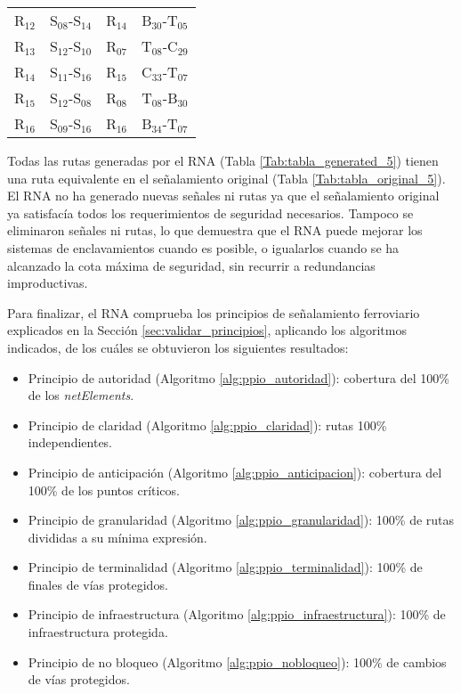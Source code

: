 \begin{table}[H]
{\begin{center}
{\begin{tabular}{ c c c c }
                    R$_{12}$ & S$_{08}$-S$_{14}$ & R$_{14}$ & B$_{30}$-T$_{05}$ \\
                    R$_{13}$ & S$_{12}$-S$_{10}$ & R$_{07}$ & T$_{08}$-C$_{29}$ \\
                    R$_{14}$ & S$_{11}$-S$_{16}$ & R$_{15}$ & C$_{33}$-T$_{07}$ \\
                    R$_{15}$ & S$_{12}$-S$_{08}$ & R$_{08}$ & T$_{08}$-B$_{30}$ \\
                    R$_{16}$ & S$_{09}$-S$_{16}$ & R$_{16}$ & B$_{34}$-T$_{07}$ \\
                \hline
            \end{tabular}
     		}
     	\end{center}
        }    
    \end{table}
    
    Todas las rutas generadas por el RNA (Tabla \ref{Tab:tabla_generated_5}) tienen una ruta equivalente en el señalamiento original (Tabla \ref{Tab:tabla_original_5}). El RNA no ha generado nuevas señales ni rutas ya que el señalamiento original ya satisfacía todos los requerimientos de seguridad necesarios. Tampoco se eliminaron señales ni rutas, lo que demuestra que el RNA puede mejorar los sistemas de enclavamientos cuando es posible, o igualarlos cuando se ha alcanzado la cota máxima de seguridad, sin recurrir a redundancias improductivas.
    
    Para finalizar, el RNA comprueba los principios de señalamiento ferroviario explicados en la Sección \ref{sec:validar_principios}, aplicando los algoritmos indicados, de los cuáles se obtuvieron los siguientes resultados:
    
    \begin{itemize}
    	\item Principio de autoridad (Algoritmo \ref{alg:ppio_autoridad}): cobertura del 100\% de los \textit{netElements}.
    	\item Principio de claridad (Algoritmo \ref{alg:ppio_claridad}): rutas 100\% independientes.
    	\item Principio de anticipación (Algoritmo \ref{alg:ppio_anticipacion}): cobertura del 100\% de los puntos críticos.
    	\item Principio de granularidad (Algoritmo \ref{alg:ppio_granularidad}): 100\% de rutas divididas a su mínima expresión.
    	\item Principio de terminalidad (Algoritmo \ref{alg:ppio_terminalidad}): 100\% de finales de vías protegidos.
    	\item Principio de infraestructura (Algoritmo \ref{alg:ppio_infraestructura}): 100\% de infraestructura protegida.
    	\item Principio de no bloqueo (Algoritmo \ref{alg:ppio_nobloqueo}): 100\% de cambios de vías protegidos.
    \end{itemize}	